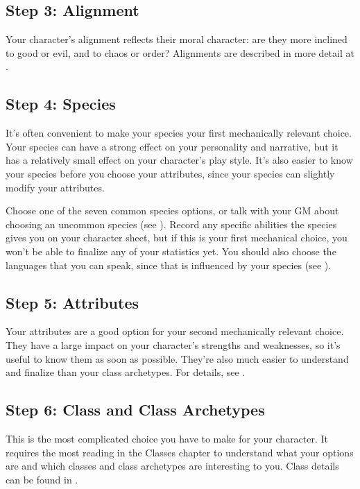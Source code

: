     \subsection{Step 3: Alignment}
        Your character's alignment reflects their moral character: are they more inclined to good or evil, and to chaos or order?
        Alignments are described in more detail at .

    \subsection{Step 4: Species}
        It's often convenient to make your species your first mechanically relevant choice.
        Your species can have a strong effect on your personality and narrative, but it has a relatively small effect on your character's play style.
        It's also easier to know your species before you choose your attributes, since your species can slightly modify your attributes.

        Choose one of the seven common species options, or talk with your GM about choosing an uncommon species (see ).
        Record any specific abilities the species gives you on your character sheet, but if this is your first mechanical choice, you won't be able to finalize any of your statistics yet.
        You should also choose the languages that you can speak, since that is influenced by your species (see ).

    \subsection{Step 5: Attributes}
        Your attributes are a good option for your second mechanically relevant choice.
        They have a large impact on your character's strengths and weaknesses, so it's useful to know them as soon as possible.
        They're also much easier to understand and finalize than your class archetypes.
        For details, see .

    \subsection{Step 6: Class and Class Archetypes}
        This is the most complicated choice you have to make for your character.
        It requires the most reading in the Classes chapter to understand what your options are and which classes and class archetypes are interesting to you.
        Class details can be found in .

